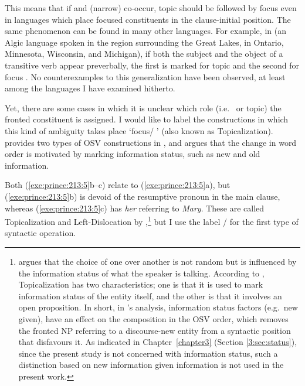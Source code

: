 \noindent This means that if  and (narrow) 
co-occur, topic should be followed by focus even in languages which
place focused constituents in the clause-initial
position. The same phenomenon can
be found in many other languages.  For example, in 
(an Algic language spoken in the region surrounding the Great Lakes,
in Ontario, Minnesota, Wisconsin, and Michigan), if both the subject
and the object of a transitive verb appear preverbally, the first is
marked for topic and the second for focus \citep{valentine:01}. No
counterexamples to this generalization have been observed, at least
among the languages I have examined hitherto.




Yet, there are some cases in which it is unclear which role
(i.e.\  or topic) the fronted constituent is assigned.  I
would like to label the constructions in which this kind of ambiguity
takes place `focus/ ' (also known as
Topicalization). \citet{prince:84} provides two
types of OSV constructions in , and argues that the
change in word order is motivated by marking information status, such
as new and old information.






 
\noindent Both (\ref{exe:prince:213:5}b--c) relate to
(\ref{exe:prince:213:5}a), but (\ref{exe:prince:213:5}b) is devoid of
the resumptive pronoun in the main clause, whereas
(\ref{exe:prince:213:5}c) has \textit{her} referring to
\textit{Mary}. These are called Topicalization and Left-Dislocation by
\citeauthor{prince:84},\footnote{\citet{prince:84} argues that the
  choice of one over another is not random but is influenced by the
  information status of what the speaker is talking.  According to
  \citeauthor{prince:84}, Topicalization has two characteristics; one
  is that it is used to mark information status of the entity itself,
  and the other is that it involves an open proposition.  In short, in
  \citeauthor{prince:84}'s analysis, information status factors
  (e.g.\ new \vs given), have an effect on the composition in the OSV
  order, which removes the fronted NP referring to a discourse-new
  entity from a syntactic position that disfavours it. As indicated in Chapter~\ref{chapter3}
  (Section \ref{3:sec:status}), since the present study is not concerned with
  information status, such a distinction based on new information \vs
  given information is not used in the present work.} but I use the
label /  for the first type of
syntactic operation.





